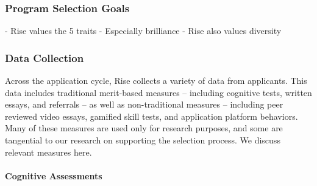 \subsubsection{Program Selection Goals}
- Rise values the 5 traits
- Especially brilliance
- Rise also values diversity

\subsubsection{Data Collection}
Across the application cycle, Rise collects a variety of data from applicants. This data includes traditional merit-based measures – including cognitive tests, written essays, and referrals – as well as non-traditional measures – including peer reviewed video essays, gamified skill tests, and application platform behaviors. Many of these measures are used only for research purposes, and some are tangential to our research on supporting the selection process. We discuss relevant measures here.


\paragraph{Cognitive Assessments}

